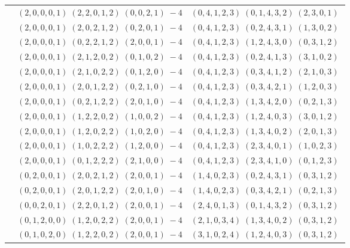 \documentclass[11pt]{article}
\begin{document}
\begin{longtable}[l]{|c|c|c|}
 \cline{2-3} 
 & $(2 ,0 ,0 ,0 ,1) \;(2 ,2 ,0 ,1 ,2) \;(0 ,0 ,2 ,1) \;-4$ & $(0 ,4 ,1 ,2 ,3) \;(0 ,1 ,4 ,3 ,2) \;(2 ,3 ,0 ,1) \;$\\ 
 \cline{2-3} 
 & $(2 ,0 ,0 ,0 ,1) \;(2 ,0 ,2 ,1 ,2) \;(0 ,2 ,0 ,1) \;-4$ & $(0 ,4 ,1 ,2 ,3) \;(0 ,2 ,4 ,3 ,1) \;(1 ,3 ,0 ,2) \;$\\ 
 \cline{2-3} 
 & $(2 ,0 ,0 ,0 ,1) \;(0 ,2 ,2 ,1 ,2) \;(2 ,0 ,0 ,1) \;-4$ & $(0 ,4 ,1 ,2 ,3) \;(1 ,2 ,4 ,3 ,0) \;(0 ,3 ,1 ,2) \;$\\ 
 \cline{2-3} 
 & $(2 ,0 ,0 ,0 ,1) \;(2 ,1 ,2 ,0 ,2) \;(0 ,1 ,0 ,2) \;-4$ & $(0 ,4 ,1 ,2 ,3) \;(0 ,2 ,4 ,1 ,3) \;(3 ,1 ,0 ,2) \;$\\ 
 \cline{2-3} 
 & $(2 ,0 ,0 ,0 ,1) \;(2 ,1 ,0 ,2 ,2) \;(0 ,1 ,2 ,0) \;-4$ & $(0 ,4 ,1 ,2 ,3) \;(0 ,3 ,4 ,1 ,2) \;(2 ,1 ,0 ,3) \;$\\ 
 \cline{2-3} 
 & $(2 ,0 ,0 ,0 ,1) \;(2 ,0 ,1 ,2 ,2) \;(0 ,2 ,1 ,0) \;-4$ & $(0 ,4 ,1 ,2 ,3) \;(0 ,3 ,4 ,2 ,1) \;(1 ,2 ,0 ,3) \;$\\ 
 \cline{2-3} 
 & $(2 ,0 ,0 ,0 ,1) \;(0 ,2 ,1 ,2 ,2) \;(2 ,0 ,1 ,0) \;-4$ & $(0 ,4 ,1 ,2 ,3) \;(1 ,3 ,4 ,2 ,0) \;(0 ,2 ,1 ,3) \;$\\ 
 \cline{2-3} 
 & $(2 ,0 ,0 ,0 ,1) \;(1 ,2 ,2 ,0 ,2) \;(1 ,0 ,0 ,2) \;-4$ & $(0 ,4 ,1 ,2 ,3) \;(1 ,2 ,4 ,0 ,3) \;(3 ,0 ,1 ,2) \;$\\ 
 \cline{2-3} 
 & $(2 ,0 ,0 ,0 ,1) \;(1 ,2 ,0 ,2 ,2) \;(1 ,0 ,2 ,0) \;-4$ & $(0 ,4 ,1 ,2 ,3) \;(1 ,3 ,4 ,0 ,2) \;(2 ,0 ,1 ,3) \;$\\ 
 \cline{2-3} 
 & $(2 ,0 ,0 ,0 ,1) \;(1 ,0 ,2 ,2 ,2) \;(1 ,2 ,0 ,0) \;-4$ & $(0 ,4 ,1 ,2 ,3) \;(2 ,3 ,4 ,0 ,1) \;(1 ,0 ,2 ,3) \;$\\ 
 \cline{2-3} 
 & $(2 ,0 ,0 ,0 ,1) \;(0 ,1 ,2 ,2 ,2) \;(2 ,1 ,0 ,0) \;-4$ & $(0 ,4 ,1 ,2 ,3) \;(2 ,3 ,4 ,1 ,0) \;(0 ,1 ,2 ,3) \;$\\ 
 \cline{2-3} 
 & $(0 ,2 ,0 ,0 ,1) \;(2 ,0 ,2 ,1 ,2) \;(2 ,0 ,0 ,1) \;-4$ & $(1 ,4 ,0 ,2 ,3) \;(0 ,2 ,4 ,3 ,1) \;(0 ,3 ,1 ,2) \;$\\ 
 \cline{2-3} 
 & $(0 ,2 ,0 ,0 ,1) \;(2 ,0 ,1 ,2 ,2) \;(2 ,0 ,1 ,0) \;-4$ & $(1 ,4 ,0 ,2 ,3) \;(0 ,3 ,4 ,2 ,1) \;(0 ,2 ,1 ,3) \;$\\ 
 \cline{2-3} 
 & $(0 ,0 ,2 ,0 ,1) \;(2 ,2 ,0 ,1 ,2) \;(2 ,0 ,0 ,1) \;-4$ & $(2 ,4 ,0 ,1 ,3) \;(0 ,1 ,4 ,3 ,2) \;(0 ,3 ,1 ,2) \;$\\ 
 \cline{2-3} 
 & $(0 ,1 ,2 ,0 ,0) \;(1 ,2 ,0 ,2 ,2) \;(2 ,0 ,0 ,1) \;-4$ & $(2 ,1 ,0 ,3 ,4) \;(1 ,3 ,4 ,0 ,2) \;(0 ,3 ,1 ,2) \;$\\ 
 \cline{2-3} 
 & $(0 ,1 ,0 ,2 ,0) \;(1 ,2 ,2 ,0 ,2) \;(2 ,0 ,0 ,1) \;-4$ & $(3 ,1 ,0 ,2 ,4) \;(1 ,2 ,4 ,0 ,3) \;(0 ,3 ,1 ,2) \;$\\ 

\end{longtable}
\end{document}
